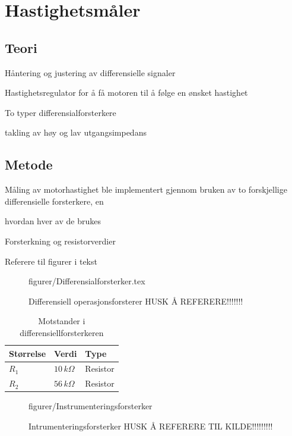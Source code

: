\section{Hastighetsmåler}
\subsection{Teori}
Håntering og justering av differensielle signaler

Hastighetsregulator for å få motoren til å følge en ønsket hastighet

To typer differensialforsterkere

takling av høy og lav utgangsimpedans






\subsection{Metode}
Måling av motorhastighet ble implementert gjennom bruken av to forskjellige differensielle forsterkere, en 

hvordan hver av de brukes

Forsterkning og resistorverdier

Referere til figurer i tekst


\begin{figure} [h]
     {figurer/Differensialforsterker.tex}
    \caption{Differensiell operasjonsforsterer HUSK Å REFERERE!!!!!!!}
    \label{fig:differensialforsterker}
\end{figure}


\begin{table}[h]
	\centering
    \caption{Motstander i differensiellforsterkeren}
	\begin{tabular}{lll}
		\toprule
		Størrelse & Verdi & Type \\
		\midrule
        $R_1$ & $10\,k\Omega$& Resistor \\
        $R_2$ & $56\,k\Omega$ & Resistor\\
		\bottomrule
	\end{tabular}
\label{tab:eksempeltabell}
\end{table}


\begin{figure} [h]
    \centering
     {figurer/Instrumenteringsforsterker}
    \caption{Intrumenteringsforsterker HUSK Å REFERERE TIL KILDE!!!!!!!!!}
    \label{fig:instrumenteringsforsterker}
\end{figure}


